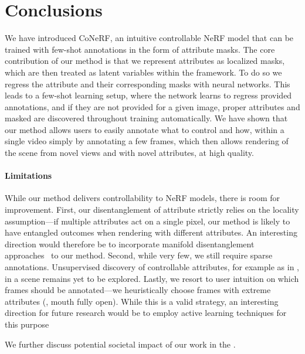 \section{Conclusions}
We have introduced CoNeRF, an intuitive controllable NeRF model that can be trained with few-shot annotations in the form of attribute masks.
The core contribution of our method is that we represent attributes as localized masks, which are then treated as latent variables within the framework.
To do so we regress the attribute and their corresponding masks with neural networks.
This leads to a few-shot learning setup, where the network learns to regress provided annotations, and if they are not provided for a given image, proper attributes and masked are discovered throughout training automatically.
We have shown that our method allows users to easily annotate what to control and how, within a single video simply by annotating a few frames, which then allows rendering of the scene from novel views and with novel attributes, at high quality.

\paragraph{Limitations}
While our method delivers controllability to NeRF models, there is room for improvement.
First, our disentanglement of attribute strictly relies on the locality assumption---if multiple attributes act on a single pixel, our method is likely to have entangled outcomes when rendering with different attributes. 
An interesting direction would therefore be to incorporate manifold disentanglement approaches~\cite{li2020markov,zhang2021product} to our method.
Second, while very few, we still require sparse annotations.
Unsupervised discovery of controllable attributes, for example as in \cite{kulkarni2019unsupervised}, in a scene remains yet to be explored.
Lastly, we resort to user intuition on which frames should be annotated---we heuristically choose frames with extreme attributes (\eg, mouth fully open).
While this is a valid strategy, an interesting direction for future research would be to employ active learning techniques for this purpose~\cite{ren2020survey,belharbi2021deep}

We further discuss potential societal impact of our work in the \SupplementaryMaterial.


\endinput